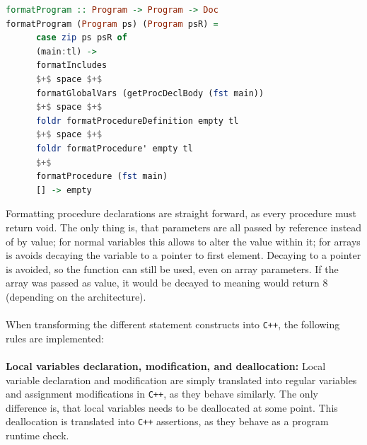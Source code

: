 \begin{lstlisting}[language=Haskell, label={lst:formatMain}, caption={Formatting AST into \texttt{C++}}]
formatProgram :: Program -> Program -> Doc
formatProgram (Program ps) (Program psR) =
      case zip ps psR of
      (main:tl) ->
      formatIncludes
      $+$ space $+$
      formatGlobalVars (getProcDeclBody (fst main))
      $+$ space $+$
      foldr formatProcedureDefinition empty tl
      $+$ space $+$
      foldr formatProcedure' empty tl
      $+$
      formatProcedure (fst main)
      [] -> empty
\end{lstlisting}
\noindent
Formatting procedure declarations are straight forward, as every procedure must return void.
The only thing is, that parameters are all passed by reference instead of by value; for
normal variables this allows to alter the value within it; for arrays is avoids decaying the
variable to a pointer to first element. Decaying to a pointer is avoided, so the function
 can still be used, even on array parameters. If the array was passed as value,
it would be decayed to  meaning  would return $8$ (depending on the
architecture).
\\
\\
When transforming the different statement constructs into \texttt{C++}, the following rules
are implemented:
\\
\\
\textbf{Local variables declaration, modification, and deallocation:}
Local variable declaration and modification are simply translated into regular variables and
assignment modifications in \texttt{C++}, as they behave
similarly. The only difference is, that \lan local variables needs to be deallocated at some
point. This deallocation is translated into \texttt{C++} assertions, as they behave as a
program runtime check.

